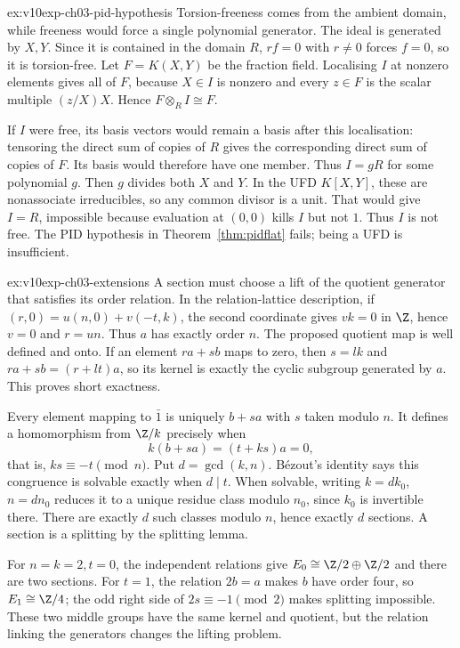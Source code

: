 \begin{solution}{ex:v10exp-ch03-pid-hypothesis}
\idea Torsion-freeness comes from the ambient domain, while freeness would force a single polynomial generator.
\writeup The ideal is generated by $X,Y$. Since it is contained in the domain $R$, $rf=0$ with $r\ne0$ forces $f=0$, so it is torsion-free. Let $F=K(X,Y)$ be the fraction field. Localising $I$ at nonzero elements gives all of $F$, because $X\in I$ is nonzero and every $z\in F$ is the scalar multiple $(z/X)X$. Hence $F\otimes_RI\cong F$.

If $I$ were free, its basis vectors would remain a basis after this localisation: tensoring the direct sum of copies of $R$ gives the corresponding direct sum of copies of $F$. Its basis would therefore have one member. Thus $I=gR$ for some polynomial $g$. Then $g$ divides both $X$ and $Y$. In the UFD $K[X,Y]$, these are nonassociate irreducibles, so any common divisor is a unit. That would give $I=R$, impossible because evaluation at $(0,0)$ kills $I$ but not $1$. Thus $I$ is not free. The PID hypothesis in Theorem~\ref{thm:pidflat} fails; being a UFD is insufficient.
\end{solution}

\begin{solution}{ex:v10exp-ch03-extensions}
\idea A section must choose a lift of the quotient generator that satisfies its order relation.
\writeup In the relation-lattice description, if $(r,0)=u(n,0)+v(-t,k)$, the second coordinate gives $vk=0$ in $\Z$, hence $v=0$ and $r=un$. Thus $a$ has exactly order $n$. The proposed quotient map is well defined and onto. If an element $ra+sb$ maps to zero, then $s=lk$ and $ra+sb=(r+lt)a$, so its kernel is exactly the cyclic subgroup generated by $a$. This proves short exactness.

Every element mapping to $\bar1$ is uniquely $b+sa$ with $s$ taken modulo $n$. It defines a homomorphism from $\Z/k$ precisely when
\[
k(b+sa)=(t+ks)a=0,
\]
that is, $ks\equiv-t\pmod n$. Put $d=\gcd(k,n)$. Bézout's identity says this congruence is solvable exactly when $d\mid t$. When solvable, writing $k=dk_0$, $n=dn_0$ reduces it to a unique residue class modulo $n_0$, since $k_0$ is invertible there. There are exactly $d$ such classes modulo $n$, hence exactly $d$ sections. A section is a splitting by the splitting lemma.

For $n=k=2,t=0$, the independent relations give $E_0\cong\Z/2\oplus\Z/2$ and there are two sections. For $t=1$, the relation $2b=a$ makes $b$ have order four, so $E_1\cong\Z/4$; the odd right side of $2s\equiv-1\pmod2$ makes splitting impossible. These two middle groups have the same kernel and quotient, but the relation linking the generators changes the lifting problem.
\end{solution}

